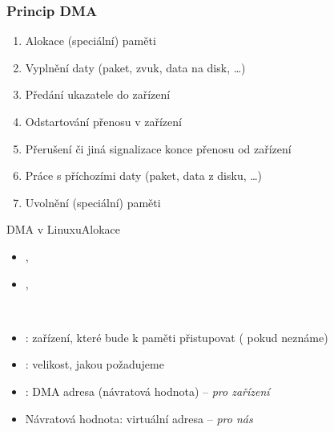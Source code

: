 \begin{frame}
  \frametitle{Princip DMA}

  \begin{enumerate}
  \item Alokace (speciální) paměti
  \item<1> Vyplnění daty (paket, zvuk, data na disk, \dots)
  \item Předání ukazatele do zařízení
  \item Odstartování přenosu v zařízení
  \item Přerušení či jiná signalizace konce přenosu od zařízení
  \item<2> Práce s příchozími daty (paket, data z disku, \dots)
  \item Uvolnění (speciální) paměti
  \end{enumerate}

\end{frame}

\begin{frame}{DMA v Linuxu}{Alokace}

  \begin{itemize}
  \item {}, 
  \item {}, 
  \end{itemize}

  \pause
  \bigskip

  \footnotesize{}\\[-0.3em]
  \begin{itemize}
  \item {}: zařízení, které bude k paměti přistupovat
    ( pokud neznáme)
  \item {}: velikost, jakou požadujeme
  \item {}: DMA adresa (návratová hodnota) -- \emph{pro zařízení}
  \item Návratová hodnota: virtuální adresa -- \emph{pro nás}
  \end{itemize}

\end{frame}

